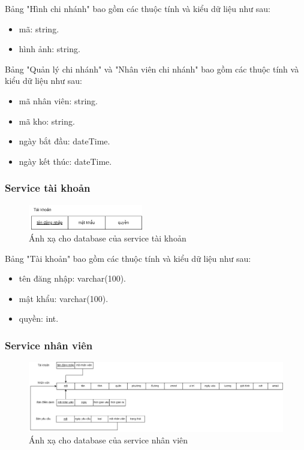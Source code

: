 Bảng "Hình chi nhánh" bao gồm các thuộc tính và kiểu dữ liệu như sau:
\begin{itemize}
	\item mã: string.
	\item hình ảnh: string.
\end{itemize}

Bảng "Quản lý chi nhánh" và "Nhân viên chi nhánh"  bao gồm các thuộc tính và kiểu dữ liệu như sau:
\begin{itemize}
	\item mã nhân viên: string.
	\item mã kho: string.
	\item ngày bắt đầu: dateTime.
	\item ngày kết thúc: dateTime.
\end{itemize}


\subsubsection{Service tài khoản}
\begin{figure}[!htp]
	\begin{center}
		\includegraphics[width=5cm]{img/database/mapping/account.png}
	\end{center}
	\caption{Ánh xạ cho database của service tài khoản}
\end{figure}

Bảng "Tài khoản" bao gồm các thuộc tính và kiểu dữ liệu như sau:
\begin{itemize}
	\item tên đăng nhập: varchar(100).
	\item mật khẩu: varchar(100).
	\item quyền: int.
\end{itemize}


\subsubsection{Service nhân viên}
\begin{figure}[!htp]
	\begin{center}
		\includegraphics[width=17cm]{img/database/mapping/staff.png}
		\newline
		\caption{Ánh xạ cho database của service nhân viên}
	\end{center}
\end{figure}

